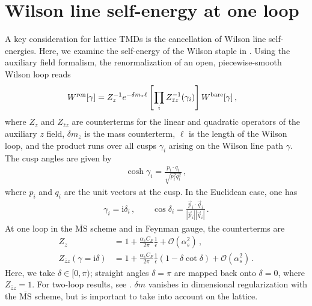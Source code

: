 \documentclass[11pt,a4paper]{article}
\newcommand{\MSbar}{{\overline{\mathrm{MS}}}}
\newcommand{\img}{\mathrm{i}}
\newcommand{\eps}{\epsilon}
\newcommand{\cO}{\mathcal{O}}
\newcommand{\nn}{\nonumber}
\newcommand{\as}{\alpha_s}
\begin{document}
\section{Wilson line self-energy at one loop}
\label{app:self_energy}

A key consideration for lattice TMDs is the cancellation of
Wilson line self-energies.
Here, we examine the self-energy of the Wilson staple in .
Using the auxiliary field formalism, the renormalization of an open,
piecewise-smooth Wilson loop reads~\cite{Dorn:1986dt}
\begin{align} \label{eq:Wren_4}
 W^{\rm ren}[\gamma] &
 = Z_z^{-1} e^{-\delta m_z \ell} \left[ \prod_i Z_{\bar z z}^{-1}(\gamma_i)\right] W^{\rm bare}[\gamma]
\,,\end{align}
where $Z_z$ and $Z_{\bar zz}$ are counterterms for the linear and quadratic
operators of the auxiliary $z$ field, $\delta m_z$ is the mass counterterm,
$\ell$ is the length of the Wilson loop, and the product runs over all cusps $\gamma_i$
arising on the Wilson line path $\gamma$. The cusp angles are given by
\begin{align}
 \cosh\gamma_i = \frac{p_i \cdot q_i}{\sqrt{p_i^2 q_i^2}}
\,,\end{align}
where $p_i$ and $q_i$ are the unit vectors at the cusp.
In the Euclidean case, one has
\begin{align}
 \gamma_i = \img \delta_i
\,,\qquad
 \cos\delta_i = \frac{\vec p_i \cdot \vec q_i}{|\vec p_i| |\vec q_i|}
\,.\end{align}
At one loop in the $\MSbar$ scheme and in Feynman gauge, the counterterms are~\cite{Dorn:1986dt}
\begin{align}
 Z_z &
 = 1 + \frac{\as C_F}{2\pi} \frac{1}{\eps} + \cO(\as^2)
\,,\nn\\
 Z_{\bar z z}(\gamma = \img \delta) &
 = 1 + \frac{\as C_F}{2\pi} \frac{1}{\eps}  \left( 1 - \delta \cot\delta \right) + \cO(\as^2)
\,.\end{align}
Here, we take $\delta \in [0, \pi)$;
straight angles $\delta = \pi$ are mapped back onto $\delta = 0$, where $Z_{\bar zz} = 1$.
For two-loop results, see . $\delta m$ vanishes in  dimensional regularization with the $\MSbar$ scheme, but is important to
take into account on the lattice.
\end{document}
